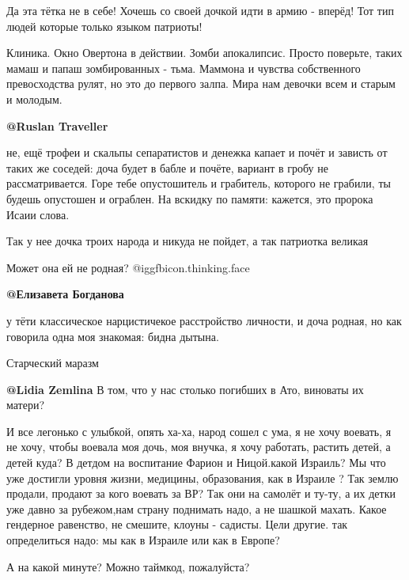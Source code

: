 \begin{itemize}

Да эта тётка не в себе! Хочешь со своей дочкой идти в армию - вперёд! Тот тип
людей которые только языком патриоты!


Клиника. Окно Овертона в действии. Зомби апокалипсис. Просто поверьте, таких
мамаш и папаш зомбированных  - тьма. Маммона и чувства собственного
превосходства рулят, но это до первого залпа. Мира нам  девочки всем и старым и
молодым. 

\textbf{@Ruslan Traveller}  

не, ещё трофеи и скальпы сепаратистов и денежка капает и почёт  и зависть   от
таких же соседей: доча будет в бабле и почёте, вариант в гробу не
рассматривается. Горе тебе опустошитель и грабитель, которого не грабили, ты
будешь опустошен и ограблен. На вскидку по памяти: кажется, это пророка Исаии
слова.

Так у нее дочка троих народа и никуда не пойдет, а так патриотка великая

Может она ей не родная? @igg{fbicon.thinking.face} 

\textbf{@Елизавета Богданова}  

у тёти классическое нарцистичекое расстройство личности, и доча родная, но как
говорила одна моя знакомая: бидна дытына.


Старческий маразм

\textbf{@Lidia Zemlina} В том, что у нас столько погибших в Ато, виноваты их матери? 


И все легонько с улыбкой, опять ха-ха, народ сошел с ума, я не хочу воевать, я
не хочу, чтобы воевала моя дочь, моя внучка, я хочу работать, растить детей, а
детей куда? В детдом на воспитание Фарион и Ницой.какой Израиль? Мы что уже
достигли уровня жизни, медицины, образования, как в Израиле ? Так землю
продали, продают за кого воевать за ВР? Так они на  самолёт и ту-ту, а их детки
уже давно за рубежом,нам  страну поднимать надо, а не шашкой махать. Какое
гендерное равенство, не смешите, клоуны - садисты. Цели другие. так определиться
надо: мы как в Израиле или как в Европе?


А на какой минуте? Можно таймкод, пожалуйста?


\end{itemize}
